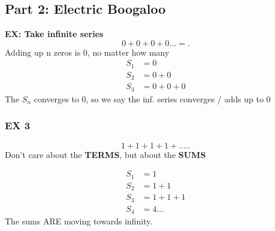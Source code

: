 \documentclass[]{article}
\begin{document}
    \subsection*{Part 2: Electric Boogaloo}
    \textbf{EX: Take infinite series}
    \\
    \[
    0 + 0 + 0 + 0... =
    .\] Adding up n zeros is 0, no matter how many 
    \begin{align}
            S_1 &= 0 \\
            S_2 &= 0+0 \\
            S_3 &= 0+0+0 
    \end{align}
    {The $S_n$ converges to 0, so we say the inf. series converges / adds up to 0 } 
     \subsubsection*{EX 3}
     \[
     1 + 1 + 1 + 1 +....
     .\] Don't care about the \textbf{TERMS}, but about the \textbf{SUMS}

     \begin{align*}
             S_1 &= 1 \\
             S_2 &= 1 + 1 \\
             S_3 &= 1 + 1 + 1 \\
             S_4 &= 4... 
     \end{align*}
     The sums ARE moving towards infinity. 
\end{document}
